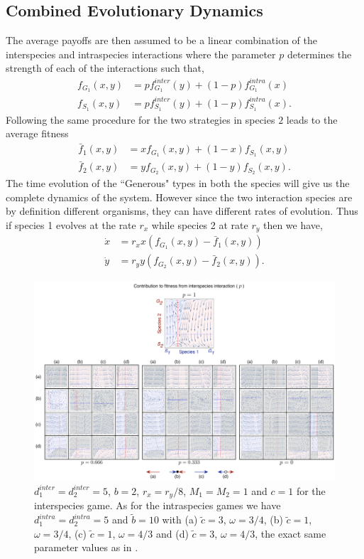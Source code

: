\documentclass[12pt]{article}
\begin{document}
\begin{appendices}
\section{Combined Evolutionary Dynamics}
\label{app:combineddyn}

The average payoffs are then assumed to be a linear combination of the interspecies and intraspecies interactions where the parameter $p$ determines the strength of each of the interactions such that,
%
\begin{align}
	f_{G_1} (x,y) &= p f^{inter}_{G_1} (y) + (1-p) f^{intra}_{G_1} (x)  \\
	f_{S_1} (x,y) &= p f^{inter}_{S_1} (y) + (1-p) f^{intra}_{S_1} (x).
\label{fiteqs}
\end{align}
%
Following the same procedure for the two strategies in species $2$ leads to the average fitness
%
\begin{align}
\bar{f}_1 (x,y) &= x f_{G_1} (x,y)+(1-x) f_ {S_1}(x,y)  \\
\bar{f}_2 (x,y) &= y f_{G_2} (x,y)+(1-y) f_{S_2}(x,y).
\label{avgfiteqs}
\end{align}
%
The time evolution of the ``Generous" types in both the species will give us the complete dynamics of the system.
However since the two interaction species are by definition different organisms, they can have different rates of evolution.
Thus if species 1 evolves at the rate $r_x$ while species 2 at rate $r_y$ then we have,
\begin{align}
\dot{x} &= r_x x \left(f_{G_1}(x,y) -  \bar{f}_1(x,y) \right)  \\
\dot{y} &= r_y y \left(f_{G_2}(x,y) -  \bar{f}_2(x,y) \right).
\label{eq:repeqapp}
\end{align}


\begin{figure}
    \includegraphics[width=\columnwidth]{../Figures/Dynamicsacrossp_reduced.pdf}
    \caption{
$d_1^{inter} = d_2^{inter} = 5$, $b = 2$, $r_x = r_y/8$, $M_1 = M_2 = 1$ and $c=1$ for the interspecies game. As for the intraspecies games we have $d_1^{intra} = d_2^{intra} = 5$ and $\tilde{b} = 10 $ with 
(a) $\tilde{c} = 3$, $\omega = 3/4$, 
(b) $\tilde{c} = 1$, $\omega = 3/4$, 
(c) $\tilde{c} = 1$, $\omega = 4/3$ and 
(d) $\tilde{c} = 3$, $\omega = 4/3$, the exact same parameter values as in \citep{hauert:JTB:2006a}.
\label{fig:appendix}
}
\end{figure}



\end{appendices}
\end{document}
